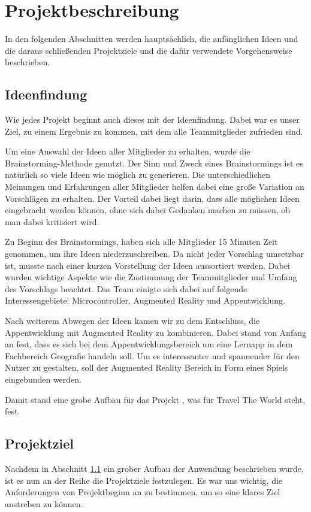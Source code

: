 \chapter{Projektbeschreibung}\label{ch:projektbeschreibung}
In den folgenden Abschnitten werden hauptsächlich, die anfänglichen Ideen und die daraus schließenden Projektziele und die dafür verwendete Vorgehensweise beschrieben.

\section{Ideenfindung}\label{ideenfindung}
Wie jedes Projekt beginnt auch dieses mit der Ideenfindung. Dabei war es unser Ziel, zu einem Ergebnis zu kommen, mit dem alle Teammitglieder zufrieden sind. 

Um eine Auswahl der Ideen aller Mitglieder zu erhalten, wurde die Brainstorming-Methode genutzt. Der Sinn und Zweck eines Brainstormings ist es natürlich so viele Ideen wie möglich zu generieren. Die unterschiedlichen Meinungen und Erfahrungen aller Mitglieder helfen dabei eine große Variation an Vorschlägen zu erhalten. Der Vorteil dabei liegt darin, dass alle möglichen Ideen eingebracht werden können, ohne sich dabei Gedanken machen zu müssen, ob man dabei kritisiert wird. 

Zu Beginn des Brainstormings, haben sich alle Mitglieder 15 Minuten Zeit genommen, um ihre Ideen niederzuschreiben. Da nicht jeder Vorschlag umsetzbar ist, musste nach einer kurzen Vorstellung der Ideen aussortiert werden. Dabei wurden wichtige Aspekte wie die Zustimmung der Teammitglieder und Umfang des Vorschlags beachtet. Das Team einigte sich dabei auf folgende Interessengebiete: Microcontroller, Augmented Reality und Appentwicklung.

Nach weiterem Abwegen der Ideen kamen wir zu dem Entschluss, die Appentwicklung mit Augmented Reality zu kombinieren. Dabei stand von Anfang an fest, dass es sich bei dem Appentwicklungsbereich um eine Lernapp in dem Fachbereich Geografie handeln soll. Um es interessanter und spannender für den Nutzer zu gestalten, soll der Augmented Reality Bereich in Form eines Spiels eingebunden werden. 

Damit stand eine grobe Aufbau für das Projekt  , was für Travel The World steht, fest.

\section{Projektziel}
\label{projektziel}
Nachdem in Abschnitt \ref{ideenfindung} ein grober Aufbau der Anwendung beschrieben wurde, ist es nun an der Reihe die Projektziele festzulegen. Es war uns wichtig, die Anforderungen von Projektbeginn an zu bestimmen, um so eine klares Ziel anstreben zu können.

